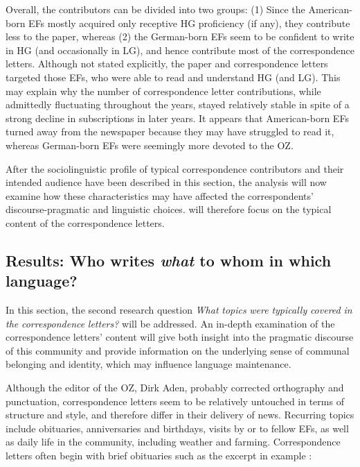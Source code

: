 \documentclass[output=paper]{langsci/langscibook}
\begin{document}
\begin{sloppypar}
Overall, the contributors can be divided into two groups: (1) Since the American-born EFs mostly acquired only receptive HG proficiency (if any), they contribute less to the paper, whereas (2) the German-born EFs seem to be confident to write in HG (and occasionally in LG), and hence contribute most of the correspondence letters. Although not stated explicitly, the paper and correspondence letters targeted those EFs, who were able to read and understand HG (and LG). This may explain why the number of correspondence letter contributions, while admittedly fluctuating throughout the years, stayed relatively stable in spite of a strong decline in subscriptions in later years. It appears that American-born EFs turned away from the newspaper because they may have struggled to read it, whereas German-born EFs were seemingly more devoted to the OZ. 
\end{sloppypar}

After the sociolinguistic profile of typical correspondence contributors and their intended audience have been described in this section, the analysis will now examine how these characteristics may have affected the correspondents’ discourse-pragmatic and linguistic choices.  will therefore focus on the typical content of the correspondence letters. 

\subsection{Results: Who writes \textit{what} to whom in which language?} %
\label{sec:rocker:4.2}

In this section, the second research question \textit{What} \textit{topics} \textit{were} \textit{typically} \textit{covered} \textit{in} \textit{the} \textit{correspondence} \textit{letters?} will be addressed. An in-depth examination of the correspondence letters’ content will give both insight into the pragmatic discourse of this community and provide information on the underlying sense of communal belonging and identity, which may influence language maintenance. 

Although the editor of the OZ, Dirk Aden, probably corrected orthography and punctuation, correspondence letters seem to be relatively untouched in terms of structure and style, and therefore differ in their delivery of news. Recurring topics include obituaries, anniversaries and birthdays, visits by or to fellow EFs, as well as daily life in the community, including weather and farming. Correspondence letters often begin with brief obituaries such as the excerpt in example :
\end{document}
